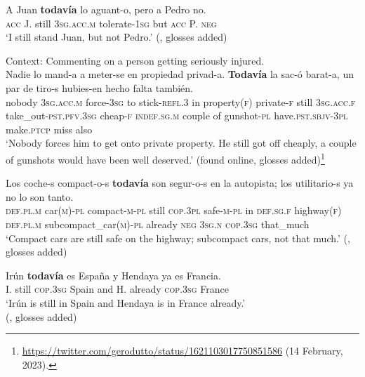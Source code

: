 \begin{exe}
	\ex\label{exAppendixSpanishTodaviaMarginal1}
	\gll A Juan \textbf{todavía} lo aguant-o, pero a Pedro no.\\
	\textsc{acc} J. still 3\textsc{sg}.\textsc{acc}.\textsc{m} tolerate-1\textsc{sg} but \textsc{acc} P. \textsc{neg}\\
	\glt \lq I still stand Juan, but not Pedro.\rq{ }(\cite[3]{EderlyCurco2016}, glosses added)

	\ex\label{exAppendixSpanishTodaviaMarginal2}
	Context: Commenting on a person getting seriously injured.\\
	\gll Nadie lo mand-a a meter-se en propiedad privad-a. \textbf{Todavía} la sac-ó barat-a, un par de tiro-s hubies-en hecho falta también.\\
	nobody 3\textsc{sg}.\textsc{acc}.\textsc{m} force-3\textsc{sg} to stick-\textsc{refl}.3 in property(\textsc{f}) private-\textsc{f} still 3\textsc{sg}.\textsc{acc}.\textsc{f} take\_out-\textsc{pst}.\textsc{pfv}.3\textsc{sg} cheap-\textsc{f} \textsc{indef}.\textsc{sg}.\textsc{m} couple of gunshot-\textsc{pl} have.\textsc{pst}.\textsc{sbjv}-3\textsc{pl} make.\textsc{ptcp} miss also\\
\glt \lq Nobody forces him to get onto private property. He still got off cheaply, a couple of gunshots would have been well deserved.\rq{ }(found online, glosses added)\footnote{\url{https://twitter.com/gerodutto/status/1621103017750851586} (14 February, 2023).}

	\ex\label{exAppendixSpanishTodaviaMarginal3}
	\gll Los coche-s compact-o-s \textbf{todavía} son segur-o-s en la autopista; los utilitario-s ya no lo son tanto.\\
	\textsc{def}.\textsc{pl}.\textsc{m} car(\textsc{m})-\textsc{pl} compact-\textsc{m}-\textsc{pl} still \textsc{cop}.3\textsc{pl} safe-\textsc{m}-\textsc{pl} in \textsc{def}.\textsc{sg}.\textsc{f} highway(\textsc{f}) \textsc{def}.\textsc{pl}.\textsc{m} subcompact\_car(\textsc{m})-\textsc{pl} already \textsc{neg} 3\textsc{sg}.\textsc{n} \textsc{cop}.3\textsc{sg} that\_much\\
	\glt \lq Compact cars are still safe on the highway; subcompact cars, not that much.' (\cite[221]{Bosque2016}, glosses added)

	\ex\label{exAppendixSpanishTodaviaMarginal4}
	\gll Irún \textbf{todavía} es España y Hendaya ya es Francia.\\
	I. still \textsc{cop}.3\textsc{sg} Spain and H. already \textsc{cop}.3\textsc{sg} France\\
	\glt \lq{}Irún is still in Spain and Hendaya is in France already.'
	\\(\cite[58]{Garrido1991}, glosses added)
\end{exe}

